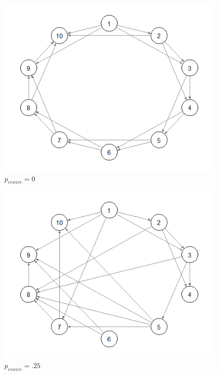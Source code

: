\documentclass{article}
\begin{document}
\begin{figure}
\centering
\includegraphics[width=1\textwidth]{p0.png}
\caption{\label{fig:p0}$p_{rewire}=0$}
\end{figure}

\begin{figure}
\centering
\includegraphics[width=1\textwidth]{p25.png}
\caption{\label{fig:p25}$p_{rewire}=.25$}
\end{figure}
\end{document}
